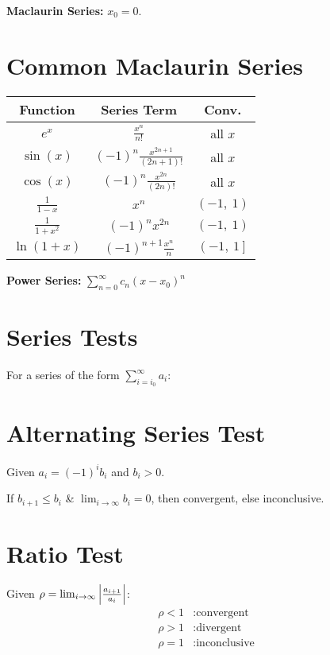 \documentclass{article}
\begin{document}
\begin{multicols}{3}
    \textbf{Maclaurin Series:} \(x_0 = 0\).
    \section*{Common Maclaurin Series}
    \begin{table}[H]
        \centering
        \begin{tabular}{c c c}
            \toprule
            \textbf{Function}         & \textbf{Series Term}                                        & \textbf{Conv.}           \\
            \midrule
            \(e^{x}\)                  & \(\frac{x^n}{n!}\)                                            & all \(x\)                  \\
            \(\sin{\left( x \right)}\)  & \(\left( -1 \right)^n \frac{x^{2n+1}}{\left( 2n+1 \right)!}\) & all \(x\)                  \\
            \(\cos{\left( x \right)}\)  & \(\left( -1 \right)^n \frac{x^{2n}}{\left( 2n \right)!}\)     & all \(x\)                  \\
            \(\frac{1}{1-x}\)           & \(x^n\)                                                       & \(\left( -1,\: 1 \right)\) \\
            \(\frac{1}{1+x^2}\)         & \(\left( -1 \right)^n x^{2n}\)                                & \(\left( -1,\: 1 \right)\) \\
            \(\ln{\left( 1+x \right)}\) & \(\left( -1 \right)^{n+1} \frac{x^n}{n}\)                     & \(\left( -1,\: 1 \right]\) \\ %
            \bottomrule
        \end{tabular}
    \end{table}
    \textbf{Power Series:} \(\sum_{n=0}^{\infty} c_n\left( x-x_0 \right)^n\)
    \section*{Series Tests}
    For a series of the form \(\displaystyle\sum_{i=i_0}^\infty a_i\):
    \section*{Alternating Series Test}
    Given \(a_i = \left( -1 \right)^i b_i\) and \(b_i>0\).

    If \(b_{i+1}\leqslant b_i\) \& \(\lim_{i\to\infty}b_i=0\), then
    convergent, else inconclusive.
    \section*{Ratio Test}
    Given \(\rho = \lim_{i\to\infty}\abs{\frac{a_{i+1}}{a_i}}\):
    \begin{align*}
        \rho < 1 & : \text{convergent}   \\
        \rho > 1 & : \text{divergent}    \\
        \rho = 1 & : \text{inconclusive}
    \end{align*}

\end{multicols}
\end{document}
